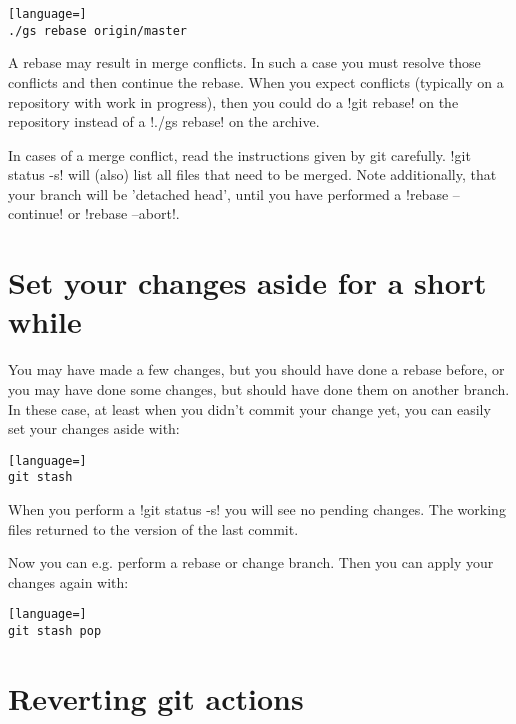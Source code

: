 
\begin{lstlisting}[language=]
./gs rebase origin/master
\end{lstlisting}

A rebase may result in merge conflicts. In such a case you must resolve those
conflicts and then continue the rebase. When you expect conflicts (typically on
a repository with work in progress), then you could do a !git rebase! on the
repository instead of a !./gs rebase! on the archive.

In cases of a merge conflict, read the instructions given by git carefully.
!git status -s! will (also) list all files that need to be merged.
Note additionally, that your branch will be 'detached head', until you have
performed a !rebase --continue! or !rebase --abort!.

\section{Set your changes aside for a short while}

You may have made a few changes, but you should have done a rebase before,
or you may have done some changes, but should have done them on another branch.
In these case, at least when you didn't commit your change yet, you can easily
set your changes aside with:


\begin{lstlisting}[language=]
git stash
\end{lstlisting}

\noindent
When you perform a !git status -s! you will see no pending changes. The working
files returned to the version of the last commit.

Now you can e.g. perform a rebase or change branch. Then you can apply your
changes again with:


\begin{lstlisting}[language=]
git stash pop
\end{lstlisting}

\section{Reverting git actions}

